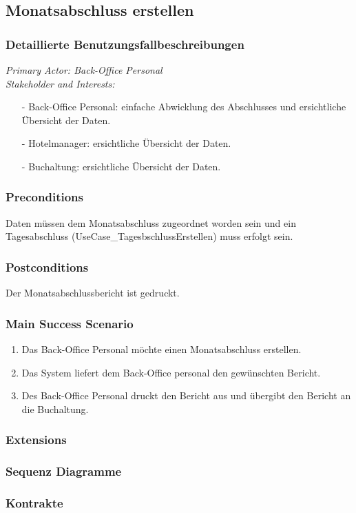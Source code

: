 \documentclass[./detailed_overview_usecases.tex]{subfiles}
\begin{document}
    \subsection{Monatsabschluss erstellen}
    \subsubsection{Detaillierte Benutzungsfallbeschreibungen}
    \textit{Primary Actor: Back-Office Personal}
    \\
    \textit{Stakeholder and Interests:}
    \begin{itemize}
        \item[-] Back-Office Personal: einfache Abwicklung des Abschlusses und ersichtliche Übersicht der Daten.
        \item[-] Hotelmanager: ersichtliche Übersicht der Daten.
        \item[-] Buchaltung: ersichtliche Übersicht der Daten.
    \end{itemize}

    \subsubsection*{Preconditions}
    Daten müssen dem Monatsabschluss zugeordnet worden sein und ein Tagesabschluss (UseCase_TagesbschlussErstellen) muss erfolgt sein.
    \subsubsection*{Postconditions}
    Der Monatsabschlussbericht ist gedruckt.

    \subsubsection*{Main Success Scenario}
    \begin{enumerate}
        \item Das Back-Office Personal möchte einen Monatsabschluss erstellen.
        \item Das System liefert dem Back-Office personal den gewünschten Bericht.
        \item Des Back-Office Personal druckt den Bericht aus und übergibt den Bericht an die Buchaltung.
    \end{enumerate}

    \subsubsection*{Extensions}
    \subsubsection{Sequenz Diagramme}
    \subsubsection{Kontrakte}
\end{document}
